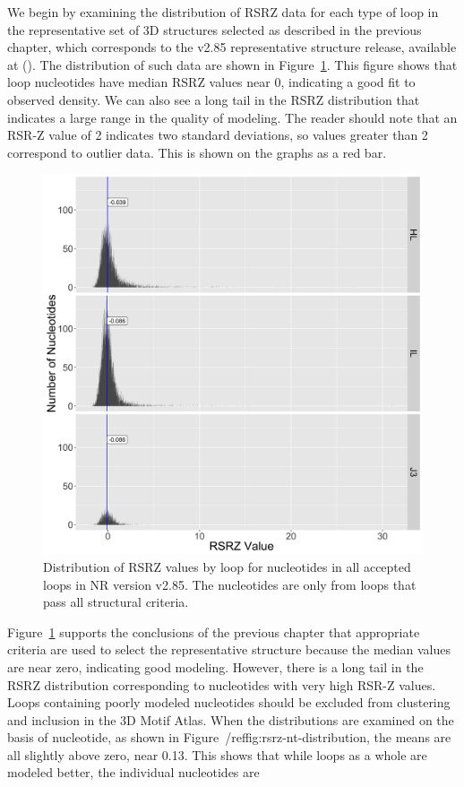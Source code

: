 We begin by examining the distribution of RSRZ data for each type of loop in the
representative set of 3D structures selected as described in the previous
chapter, which corresponds to the v2.85 representative structure release,
available at (). The
distribution of such data are shown in Figure~\ref{fig:rsrz-distribution}. This
figure shows that loop nucleotides have median RSRZ values near 0, indicating a
good fit to observed density. We can also see a long tail in the RSRZ
distribution that indicates a large range in the quality of modeling. The reader
should note that an RSR-Z value of 2 indicates two standard deviations, so
values greater than 2 correspond to outlier data. This is shown on the graphs as
a red bar.

\begin{figure}
  \includegraphics[width=0.5\linewidth]{chapter-5/figs/loops/rsrz-distribution}
  \caption{Distribution of RSRZ values by loop for nucleotides in all accepted
  loops in NR version v2.85. The nucleotides are only from loops that pass all
  structural criteria.}
  \label{fig:rsrz-distribution}
\end{figure}

Figure~\ref{fig:rsrz-distribution} supports the conclusions of the previous
chapter that appropriate criteria are used to select the representative
structure because the median values are near zero, indicating good modeling.
However, there is a long tail in the RSRZ distribution corresponding to
nucleotides with very high RSR-Z values. Loops containing poorly modeled
nucleotides should be excluded from clustering and inclusion in the 3D Motif
Atlas. When the distributions are examined on the basis of nucleotide, as shown
in Figure~/ref{fig:rsrz-nt-distribution}, the means are all slightly above zero,
near 0.13. This shows that while loops as a whole are modeled better, the
individual nucleotides are 

